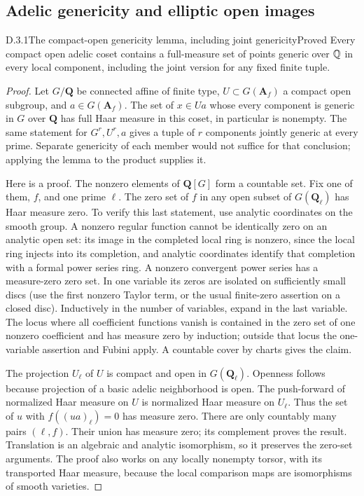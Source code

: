 \subsection{Adelic genericity and elliptic open images}

\begin{result}{D.3.1}{The compact-open genericity lemma, including joint genericity}{Proved}
Every compact open adelic coset contains a full-measure set of points generic over $\mathbb Q$ in every local component, including the joint version for any fixed finite tuple.
\end{result}
\begin{proof}
Let
\(G/\mathbf Q\) be connected affine of finite type,
\(U\subset G(\mathbf A_f)\) a compact open subgroup, and
\(a\in G(\mathbf A_f)\). The set of \(x\in Ua\) whose every
component is generic in \(G\) over \(\mathbf Q\) has full Haar
measure in this coset, in particular is nonempty. The same statement
for \(G^r,U^r,a\) gives a tuple of \(r\) components jointly generic
at every prime. Separate genericity of each member would not suffice
for that conclusion; applying the lemma to the product supplies it.

Here is a proof. The nonzero elements of \(\mathbf Q[G]\) form a
countable set. Fix one of them, \(f\), and one prime \(\ell\). The
zero set of \(f\) in any open subset of \(G(\mathbf Q_\ell)\) has
Haar measure zero. To verify this last statement, use analytic
coordinates on the smooth group. A nonzero regular function cannot
be identically zero on an analytic open set: its image in the
completed local ring is nonzero, since the local ring injects into
its completion, and analytic coordinates identify that completion
with a formal power series ring. A nonzero convergent power series
has a measure-zero zero set. In one variable its zeros are isolated
on sufficiently small discs (use the first nonzero Taylor term, or
the usual finite-zero assertion on a closed disc). Inductively in
the number of variables, expand in the last variable. The locus
where all coefficient functions vanish is contained in the zero
set of one nonzero coefficient and has measure zero by induction;
outside that locus the one-variable assertion and Fubini apply.
A countable cover by charts gives the claim.

The projection \(U_\ell\) of \(U\) is compact and open in
\(G(\mathbf Q_\ell)\). Openness follows because projection of a
basic adelic neighborhood is open. The push-forward of normalized
Haar measure on \(U\) is normalized Haar measure on \(U_\ell\).
Thus the set of \(u\) with \(f((ua)_\ell)=0\) has measure zero.
There are only countably many pairs \((\ell,f)\). Their union has
measure zero; its complement proves the result. Translation is an
algebraic and analytic isomorphism, so it preserves the zero-set
arguments. The proof also works on any locally nonempty torsor, with
its transported Haar measure, because the local comparison maps are
isomorphisms of smooth varieties.


\end{proof}
